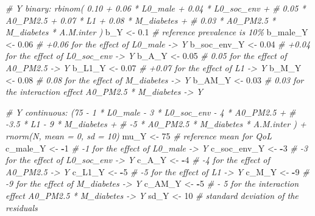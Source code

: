 \documentclass[
]{book}
\newenvironment{Shaded}{\begin{snugshade}}{\end{snugshade}}
\newcommand{\CommentTok}[1]{\textcolor[rgb]{0.56,0.35,0.01}{\textit{#1}}}
\newcommand{\DecValTok}[1]{\textcolor[rgb]{0.00,0.00,0.81}{#1}}
\newcommand{\FloatTok}[1]{\textcolor[rgb]{0.00,0.00,0.81}{#1}}
\newcommand{\NormalTok}[1]{#1}
\newcommand{\OtherTok}[1]{\textcolor[rgb]{0.56,0.35,0.01}{#1}}
\newcommand{\SpecialCharTok}[1]{\textcolor[rgb]{0.81,0.36,0.00}{\textbf{#1}}}
\begin{document}
\begin{Shaded}
\begin{Highlighting}[]
\CommentTok{\# Y binary: rbinom( 0.10 + 0.06 * L0\_male + 0.04 * L0\_soc\_env + }
\CommentTok{\#                   0.05 * A0\_PM2.5 + 0.07 * L1 + 0.08 * M\_diabetes +}
\CommentTok{\#                   0.03 * A0\_PM2.5 * M\_diabetes * A.M.inter ) }
\NormalTok{b\_Y }\OtherTok{\textless{}{-}} \FloatTok{0.1} \CommentTok{\# reference prevalence is 10\%}
\NormalTok{b\_male\_Y }\OtherTok{\textless{}{-}} \FloatTok{0.06} \CommentTok{\# +0.06 for the effect of L0\_male {-}\textgreater{} Y}
\NormalTok{b\_soc\_env\_Y }\OtherTok{\textless{}{-}} \FloatTok{0.04} \CommentTok{\# +0.04 for the effect of L0\_soc\_env {-}\textgreater{} Y}
\NormalTok{b\_A\_Y }\OtherTok{\textless{}{-}} \FloatTok{0.05} \CommentTok{\# 0.05 for the effect of A0\_PM2.5 {-}\textgreater{} Y}
\NormalTok{b\_L1\_Y }\OtherTok{\textless{}{-}} \FloatTok{0.07} \CommentTok{\# +0.07 for the effect of L1 {-}\textgreater{} Y}
\NormalTok{b\_M\_Y }\OtherTok{\textless{}{-}} \FloatTok{0.08} \CommentTok{\# 0.08 for the effect of M\_diabetes {-}\textgreater{} Y}
\NormalTok{b\_AM\_Y }\OtherTok{\textless{}{-}} \FloatTok{0.03} \CommentTok{\# 0.03 for the interaction effect A0\_PM2.5 * M\_diabetes {-}\textgreater{} Y}

\CommentTok{\# Y continuous: (75 {-} 1 * L0\_male {-} 3 * L0\_soc\_env {-} 4 * A0\_PM2.5 +}
\CommentTok{\#                {-}3.5 * L1 {-} 9 * M\_diabetes + }
\CommentTok{\#                {-}5 * A0\_PM2.5 * M\_diabetes * A.M.inter ) + rnorm(N, mean = 0, sd = 10)}
\NormalTok{mu\_Y }\OtherTok{\textless{}{-}} \DecValTok{75} \CommentTok{\# reference mean for QoL}
\NormalTok{c\_male\_Y }\OtherTok{\textless{}{-}} \SpecialCharTok{{-}}\DecValTok{1} \CommentTok{\# {-}1 for the effect of L0\_male {-}\textgreater{} Y}
\NormalTok{c\_soc\_env\_Y }\OtherTok{\textless{}{-}} \SpecialCharTok{{-}}\DecValTok{3} \CommentTok{\# {-}3 for the effect of L0\_soc\_env {-}\textgreater{} Y}
\NormalTok{c\_A\_Y }\OtherTok{\textless{}{-}} \SpecialCharTok{{-}}\DecValTok{4} \CommentTok{\# {-}4 for the effect of A0\_PM2.5 {-}\textgreater{} Y}
\NormalTok{c\_L1\_Y }\OtherTok{\textless{}{-}} \SpecialCharTok{{-}}\DecValTok{5} \CommentTok{\# {-}5 for the effect of L1 {-}\textgreater{} Y}
\NormalTok{c\_M\_Y }\OtherTok{\textless{}{-}} \SpecialCharTok{{-}}\DecValTok{9} \CommentTok{\# {-}9 for the effect of M\_diabetes {-}\textgreater{} Y}
\NormalTok{c\_AM\_Y }\OtherTok{\textless{}{-}} \SpecialCharTok{{-}}\DecValTok{5}  \CommentTok{\# {-} 5 for the interaction effect A0\_PM2.5 * M\_diabetes  {-}\textgreater{} Y}
\NormalTok{sd\_Y }\OtherTok{\textless{}{-}} \DecValTok{10} \CommentTok{\# standard deviation of the residuals}


\end{Highlighting}
\end{Shaded}
\end{document}
